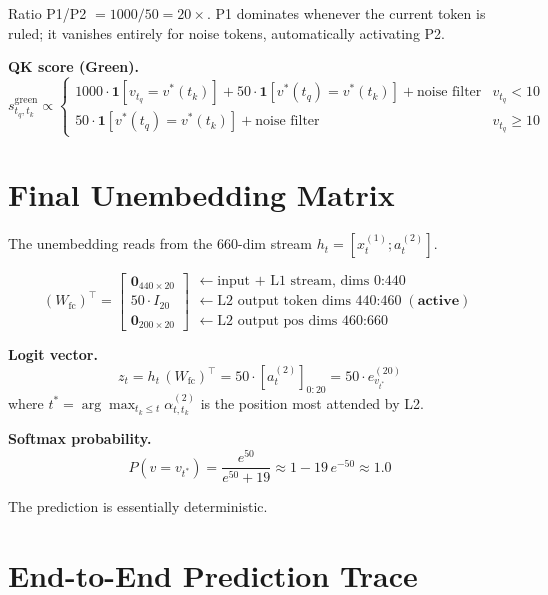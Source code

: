 \documentclass[11pt]{article}
\begin{document}
Ratio P1/P2 $=1000/50=20\times$. P1 dominates whenever the current token is ruled; it vanishes
entirely for noise tokens, automatically activating P2.

\medskip
\textbf{QK score (Green).}
\[
s_{t_q,t_k}^{\text{green}}\propto\begin{cases}
1000\cdot\mathbf{1}[v_{t_q}=v^*(t_k)]+50\cdot\mathbf{1}[v^*(t_q)=v^*(t_k)]+\text{noise filter}
& v_{t_q}<10\\
50\cdot\mathbf{1}[v^*(t_q)=v^*(t_k)]+\text{noise filter}
& v_{t_q}\geq10
\end{cases}
\tag{25}
\]

\section{Final Unembedding Matrix}

The unembedding reads from the 660-dim stream $h_t=[x_t^{(1)};a_t^{(2)}]$.

\begin{equation}
\boxed{
(W_{\mathrm{fc}})^\top=
\begin{bmatrix}\mathbf{0}_{440\times20}\\50\cdot I_{20}\\\mathbf{0}_{200\times20}\end{bmatrix}
}
\begin{array}{l}
\leftarrow\text{input + L1 stream, dims }0\text{:}440\\
\leftarrow\text{L2 output token dims }440\text{:}460\;(\textbf{active})\\
\leftarrow\text{L2 output pos dims }460\text{:}660
\end{array}
\tag{26}
\end{equation}

\medskip
\textbf{Logit vector.}
\[
z_t=h_t\,(W_{\mathrm{fc}})^\top=50\cdot[a_t^{(2)}]_{0:20}=50\cdot e_{v_{t^*}}^{(20)}
\tag{27}
\]
where $t^*=\arg\max_{t_k\leq t}\alpha_{t,t_k}^{(2)}$ is the position most attended by L2.

\medskip
\textbf{Softmax probability.}
\[
P(\hat{v}=v_{t^*})=\frac{e^{50}}{e^{50}+19}\approx 1-19\,e^{-50}\approx 1.0
\tag{28}
\]

The prediction is essentially deterministic.

\section{End-to-End Prediction Trace}
\end{document}

